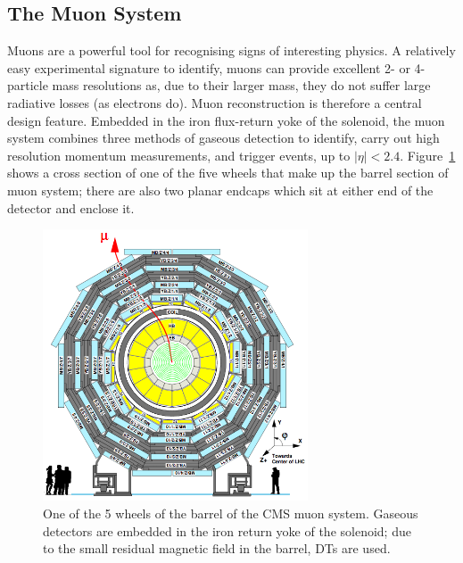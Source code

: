 
\subsection{The Muon System}
Muons are a powerful tool for recognising signs of interesting physics. 
A relatively easy experimental signature to identify, muons can provide excellent 2- or 4-particle mass resolutions 
as, due to their larger mass, they do not suffer large radiative losses (as electrons do).
Muon reconstruction is therefore a central design feature. 
Embedded in the iron flux-return yoke of the solenoid, the muon system combines three methods of gaseous detection to identify, carry out high resolution momentum measurements, and trigger events, up to $|\eta|<2.4$. 
Figure~\ref{fig:CMSmuonSys} shows a cross section of one of the five wheels that make up the barrel section of muon system; there are also two planar endcaps which sit at either end of the detector and enclose it.

\begin{figure}[htbp]
  \begin{center}
  \includegraphics[width=0.7\textwidth]{Figures/detector/muonSystems}
  \caption{One of the 5 wheels of the barrel of the \ac{CMS} muon system. Gaseous detectors are embedded in the iron return yoke of the solenoid; due to the small residual magnetic field in the barrel, \ac{DT}s are used.
}
  \label{fig:CMSmuonSys}
  \end{center}
\end{figure}



